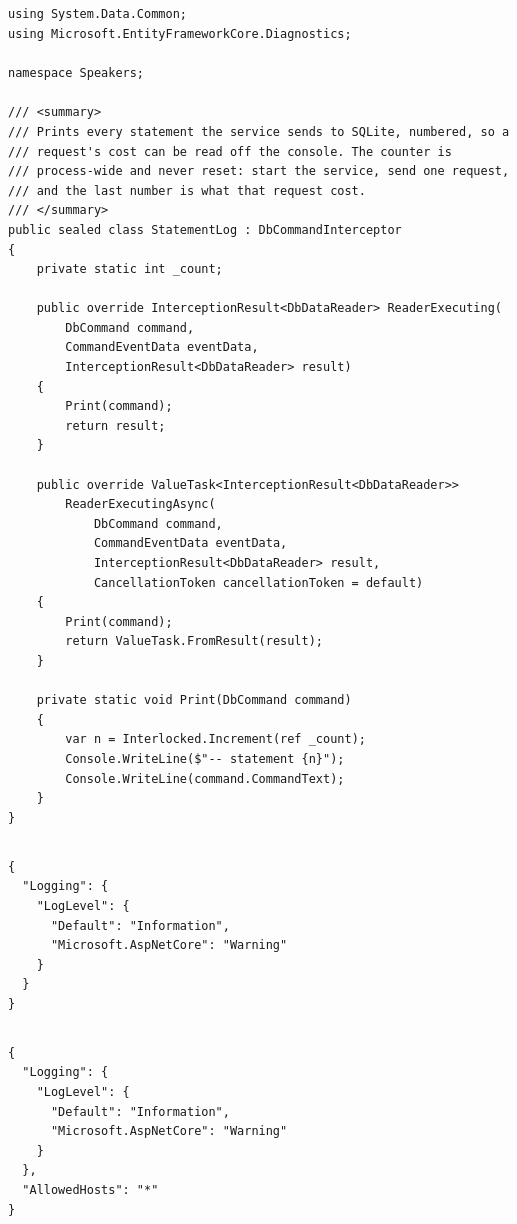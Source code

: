 \subsection*{}
\begin{verbatim}
using System.Data.Common;
using Microsoft.EntityFrameworkCore.Diagnostics;

namespace Speakers;

/// <summary>
/// Prints every statement the service sends to SQLite, numbered, so a
/// request's cost can be read off the console. The counter is
/// process-wide and never reset: start the service, send one request,
/// and the last number is what that request cost.
/// </summary>
public sealed class StatementLog : DbCommandInterceptor
{
    private static int _count;

    public override InterceptionResult<DbDataReader> ReaderExecuting(
        DbCommand command,
        CommandEventData eventData,
        InterceptionResult<DbDataReader> result)
    {
        Print(command);
        return result;
    }

    public override ValueTask<InterceptionResult<DbDataReader>>
        ReaderExecutingAsync(
            DbCommand command,
            CommandEventData eventData,
            InterceptionResult<DbDataReader> result,
            CancellationToken cancellationToken = default)
    {
        Print(command);
        return ValueTask.FromResult(result);
    }

    private static void Print(DbCommand command)
    {
        var n = Interlocked.Increment(ref _count);
        Console.WriteLine($"-- statement {n}");
        Console.WriteLine(command.CommandText);
    }
}
\end{verbatim}

\subsection*{}
\begin{verbatim}
{
  "Logging": {
    "LogLevel": {
      "Default": "Information",
      "Microsoft.AspNetCore": "Warning"
    }
  }
}
\end{verbatim}

\subsection*{}
\begin{verbatim}
{
  "Logging": {
    "LogLevel": {
      "Default": "Information",
      "Microsoft.AspNetCore": "Warning"
    }
  },
  "AllowedHosts": "*"
}
\end{verbatim}
